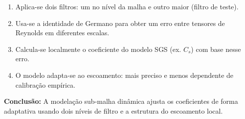 \documentclass[a4paper,12pt]{article}
\begin{document}
\begin{enumerate}
	\item Aplica-se dois filtros: um no nível da malha e outro maior (filtro de teste).
	\item Usa-se a identidade de Germano para obter um erro entre tensores de Reynolds em diferentes escalas.
	\item Calcula-se localmente o coeficiente do modelo SGS (ex. \( C_s \)) com base nesse erro.
	\item O modelo adapta-se ao escoamento: mais preciso e menos dependente de calibração empírica.
\end{enumerate}

\textbf{Conclusão:} A modelação sub-malha dinâmica ajusta os coeficientes de forma adaptativa usando dois níveis de filtro e a estrutura do escoamento local.

	
\end{document}
